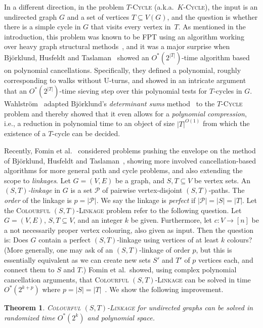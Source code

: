\documentclass[10pt,a4paper]{article}
\newtheorem{theorem}{Theorem}[section]
\newcommand{\cP}{\ensuremath{\mathcal P}\xspace}
\begin{document}
In a different direction, in the problem \textsc{$T$-Cycle}
(a.k.a.\ \textsc{$K$-Cycle}), the input is an undirected graph $G$ and
a set of vertices $T \subseteq V(G)$, and the question is whether
there is a simple cycle in $G$ that visits every vertex in~$T$.
As mentioned in the introduction, this problem was known to be FPT
using an algorithm working over heavy graph structural methods~\cite{Kawarabayashi08},
and it was a major surprise when Björklund, Husfeldt and Taslaman~\cite{BjorklundHT12soda}
showed an $O^*(2^{|T|})$-time algorithm based on polynomial cancellations. 
Specifically, they defined a polynomial, roughly corresponding to
walks without U-turns, and showed in an intricate argument 
that an $O^*(2^{|T|})$-time sieving step over this polynomial
tests for $T$-cycles in $G$. 
Wahlström~\cite{Wahlstrom13STACS} adapted Björklund's
\emph{determinant sums} method~\cite{Bjorklund14detsum} to the
\textsc{$T$-Cycle} problem and thereby showed that it even allows for
a \emph{polynomial compression}, i.e., a reduction in polynomial time
to an object of size $|T|^{O(1)}$ from which the existence of a
$T$-cycle can be decided. 

Recently, Fomin et al.~\cite{FominGKSS24} considered problems
pushing the envelope on the method of Björklund, Husfeldt and
Taslaman~\cite{BjorklundHT12soda}, showing more involved 
cancellation-based algorithms for more general path and cycle
problems, and also extending the scope to \emph{linkages}.
Let $G=(V,E)$ be a graph, and $S, T \subseteq V$ be vertex sets.
An \emph{$(S,T)$-linkage} in $G$ is a set $\cP$ of pairwise vertex-disjoint
$(S,T)$-paths. The \emph{order} of the linkage is $p=|\cP|$. 
We say the linkage is \emph{perfect} if $|\cP|=|S|=|T|$.
Let the \textsc{Colourful $(S,T)$-Linkage} problem refer to the
following question. Let $G=(V,E)$, $S, T \subseteq V$, and an integer
$k$ be given. Furthermore, let $c \colon V \to [n]$ be a not
necessarily proper vertex colouring, also given as input.
Then the question is: Does $G$ contain a perfect $(S,T)$-linkage using
vertices of at least $k$ colours? (More generally, one may ask of an
$(S,T)$-linkage of order $p$, but this is essentially equivalent
as we can create new sets $S'$ and $T'$ of $p$ vertices each,
and connect them to $S$ and $T$.)
Fomin et al.\ showed, using complex polynomial
cancellation arguments, that \textsc{Colourful $(S,T)$-Linkage}
can be solved in time $O^*(2^{k+p})$ where $p=|S|=|T|$~\cite{FominGKSS24}.
We show the following improvement.

\begin{theorem}
  \label{thm:k-st-linkage}
  \textsc{Colourful $(S,T)$-Linkage} for undirected graphs can be
  solved in randomized time $O^*(2^k)$ and polynomial space. 
\end{theorem}
\end{document}
